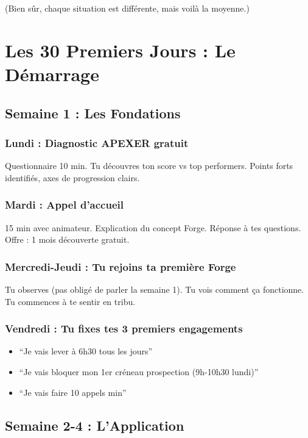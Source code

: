 \documentclass[12pt,a4paper,openany]{book}
\begin{document}
(Bien sûr, chaque situation est différente, mais voilà la moyenne.)

\clearpage

\chapter{Les 30 Premiers Jours : Le Démarrage}

\section{Semaine 1 : Les Fondations}

\subsection{Lundi : Diagnostic APEXER gratuit}

Questionnaire 10 min. Tu découvres ton score vs top performers. Points forts identifiés, axes de progression clairs.

\subsection{Mardi : Appel d'accueil}

15 min avec animateur. Explication du concept Forge. Réponse à tes questions. Offre : 1 mois découverte gratuit.

\subsection{Mercredi-Jeudi : Tu rejoins ta première Forge}

Tu observes (pas obligé de parler la semaine 1). Tu vois comment ça fonctionne. Tu commences à te sentir en tribu.

\subsection{Vendredi : Tu fixes tes 3 premiers engagements}

\begin{itemize}
\item ``Je vais lever à 6h30 tous les jours''
\item ``Je vais bloquer mon 1er créneau prospection (9h-10h30 lundi)''
\item ``Je vais faire 10 appels min''
\end{itemize}

\section{Semaine 2-4 : L'Application}
\end{document}
